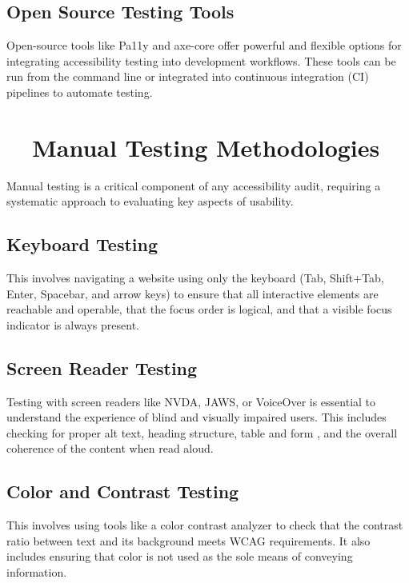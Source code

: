 \subsection{Open Source Testing Tools}
\label{subsec:open-source-tools}
Open-source tools like Pa11y and axe-core offer powerful and flexible options for integrating accessibility testing into development workflows. These tools can be run from the command line or integrated into continuous integration (CI) pipelines to automate testing.
\supercite{Pa11y, Lighthouse, DequeAxeCore}

\section{~~Manual Testing Methodologies}
\label{sec:manual-methodologies}
Manual testing is a critical component of any \gls{accessibility} audit, requiring a systematic approach to evaluating key aspects of usability.

\subsection{Keyboard  Testing}
\label{subsec:keyboard-testing}
This involves navigating a website using only the keyboard (Tab, Shift+Tab, Enter, Spacebar, and arrow keys) to ensure that all interactive elements are reachable and operable, that the focus order is logical, and that a visible focus indicator is always present.
\supercite{WebAIMKeyboardA11y}

\subsection{Screen Reader Testing}
\label{subsec:screen-reader-testing}
Testing with screen readers like NVDA, JAWS, or VoiceOver is essential to understand the experience of blind and visually impaired users. This includes checking for proper alt text, heading structure, table and form , and the overall coherence of the content when read aloud.
\supercite{WebAIM2023, WebAIMSurvey}

\subsection{Color and Contrast Testing}
\label{subsec:color-contrast-testing}
This involves using tools like a color contrast analyzer to check that the contrast ratio between text and its background meets WCAG requirements. It also includes ensuring that color is not used as the sole means of conveying information.
\supercite{WebAIMContrastChecker, WCAGContrast2018}


